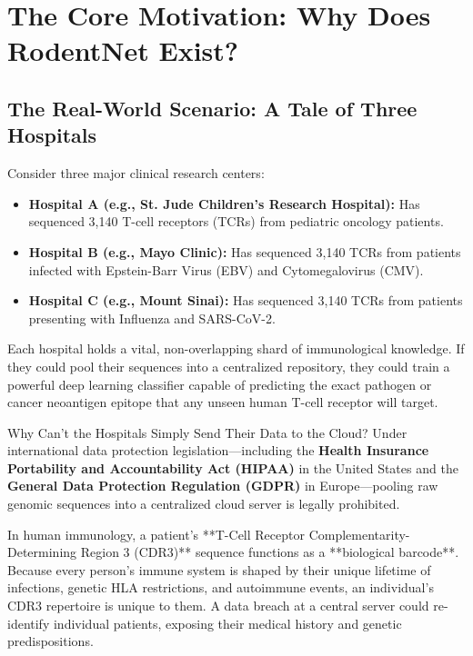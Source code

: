 \documentclass[11pt,a4paper]{report}
\begin{document}
\newpage
\tableofcontents
\newpage

\chapter{The Core Motivation: Why Does RodentNet Exist?}
\label{chap:problem}

\section{The Real-World Scenario: A Tale of Three Hospitals}
Consider three major clinical research centers:
\begin{itemize}[itemsep=2pt]
  \item \textbf{Hospital A (e.g., St. Jude Children's Research Hospital):} Has sequenced 3,140 T-cell receptors (TCRs) from pediatric oncology patients.
  \item \textbf{Hospital B (e.g., Mayo Clinic):} Has sequenced 3,140 TCRs from patients infected with Epstein-Barr Virus (EBV) and Cytomegalovirus (CMV).
  \item \textbf{Hospital C (e.g., Mount Sinai):} Has sequenced 3,140 TCRs from patients presenting with Influenza and SARS-CoV-2.
\end{itemize}

Each hospital holds a vital, non-overlapping shard of immunological knowledge. If they could pool their sequences into a centralized repository, they could train a powerful deep learning classifier capable of predicting the exact pathogen or cancer neoantigen epitope that any unseen human T-cell receptor will target.

\begin{warningbox}{Why Can't the Hospitals Simply Send Their Data to the Cloud?}
Under international data protection legislation—including the \textbf{Health Insurance Portability and Accountability Act (HIPAA)} in the United States and the \textbf{General Data Protection Regulation (GDPR)} in Europe—pooling raw genomic sequences into a centralized cloud server is legally prohibited.

In human immunology, a patient's **T-Cell Receptor Complementarity-Determining Region 3 (CDR3)** sequence functions as a **biological barcode**. Because every person's immune system is shaped by their unique lifetime of infections, genetic HLA restrictions, and autoimmune events, an individual's CDR3 repertoire is unique to them. A data breach at a central server could re-identify individual patients, exposing their medical history and genetic predispositions.
\end{warningbox}
\end{document}
